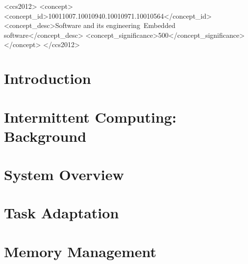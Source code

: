 \documentclass[format=acmsmall, review=false, screen=true]{acmart}
\begin{document}
\begin{abstract}	

\end{abstract}


\begin{CCSXML}
<ccs2012>
<concept>
<concept_id>10011007.10010940.10010971.10010564</concept_id>
<concept_desc>Software and its engineering~Embedded software</concept_desc>
<concept_significance>500</concept_significance>
</concept>
</ccs2012>
\end{CCSXML}




\maketitle

\section{Introduction}
\label{sec:intro}



\section{Intermittent Computing: Background}
\label{sec:background}



\section{System Overview}
\label{sec:systemdescription}



\section{Task Adaptation}
\label{sec:task_adaptation}




\section{Memory Management}
\label{sec:memory_virtulaization}


\end{document}
